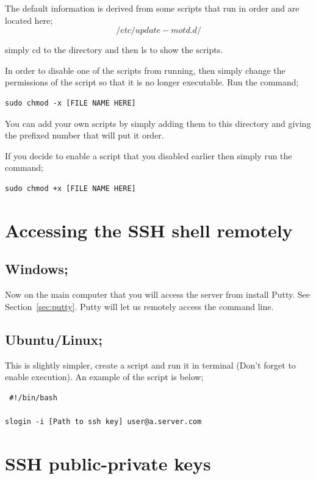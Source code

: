 The default information is derived from some scripts that run in order and are located here;
$$ /etc/update-motd.d/$$

simply cd to the directory and then ls to show the scripts.

In order to disable one of the scripts from running, then simply change the permissions of the script so that it is no longer executable.  Run the command;

\begin{lstlisting}
sudo chmod -x [FILE NAME HERE]
\end{lstlisting}

You can add your own scripts by simply adding them to this directory and giving the prefixed number that will put it order.

If you decide to enable a script that you disabled earlier then simply run the command;

\begin{lstlisting}
sudo chmod +x [FILE NAME HERE]
\end{lstlisting}

\section{Accessing the SSH shell remotely}

\subsection*{Windows;}

Now on the main computer that you will access the server from install Putty.  See Section~\ref{sec:putty}.  Putty will let us remotely access the command line.

\subsection*{Ubuntu/Linux;}

This is slightly simpler, create a script and run it in terminal (Don't forget to enable execution).  An example of the script is below;

\begin{lstlisting}
 #!/bin/bash

slogin -i [Path to ssh key] user@a.server.com
\end{lstlisting}

\section{SSH public-private keys}
\label{sec:sshkeys}

